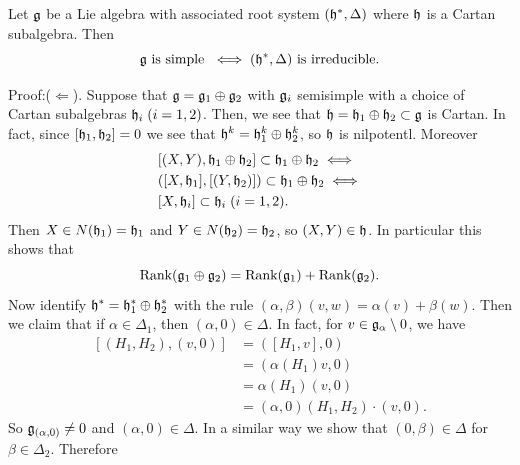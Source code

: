 \begin{dang}
    \begin{theorem}
        Let $\mathfrak{g}$ be a Lie algebra with associated root system $(\mathfrak{h}^*,\Delta)$ where $\mathfrak{h}$ is a 
        Cartan subalgebra. Then 
        \begin{equation}
            \mathfrak{g} \text{ is simple }\iff (\mathfrak{h}^*,\Delta)\text{ is irreducible}.
        \end{equation}
    \end{theorem}
\end{dang}
Proof:($\Leftarrow$). Suppose that $\mathfrak{g}=\mathfrak{g}_1\oplus\mathfrak{g}_2$ with $\mathfrak{g}_i$ semisimple with a choice of Cartan subalgebras
$\mathfrak{h}_i\;(i=1,2)$. Then, we see that $\mathfrak{h}=\mathfrak{h}_1\oplus\mathfrak{h}_2\subset \mathfrak{g}$ is Cartan. In fact, since 
$[\mathfrak{h}_1,\mathfrak{h}_2]=0$ we see that $\mathfrak{h}^k=\mathfrak{h}_1^k\oplus\mathfrak{h}_2^k$, so $\mathfrak{h}$ is nilpotentl. Moreover 
\begin{equation}
    \begin{split}
        &[(X,Y),\mathfrak{h}_1\oplus\mathfrak{h}_2]\subset \mathfrak{h}_1\oplus\mathfrak{h}_2\iff\\
        &([X,\mathfrak{h}_1],[(Y,\mathfrak{h}_2)])\subset \mathfrak{h}_1\oplus\mathfrak{h}_2\iff\\
        &[X,\mathfrak{h}_i]\subset \mathfrak{h}_i\;(i=1,2).
    \end{split}
\end{equation}
Then $X\in N(\mathfrak{h}_1)=\mathfrak{h}_1$ and $Y\in N(\mathfrak{h}_2)=\mathfrak{h}_2$, so $(X,Y)\in\mathfrak{h}$. In particular this shows that 
\begin{equation}
    \text{Rank}(\mathfrak{g}_1\oplus\mathfrak{g}_2)=\text{Rank}(\mathfrak{g}_1)+\text{Rank}(\mathfrak{g}_2).
\end{equation}
Now identify $\mathfrak{h}^*=\mathfrak{h}_1^*\oplus\mathfrak{h}_2^*$ with the rule 
$(\alpha,\beta)(v,w)=\alpha(v)+\beta(w)$. Then we claim that if $\alpha\in\Delta_1$, then $(\alpha,0)\in\Delta$. In fact, 
for $v\in\mathfrak{g}_\alpha\setminus0$, we have  
\begin{equation}
    \begin{split}
        [(H_1,H_2),(v,0)]&=([H_1,v],0)\\
        &=(\alpha(H_1)v,0)\\
        &=\alpha(H_1)(v,0)\\
        &=(\alpha,0)(H_1,H_2)\cdot(v,0).
    \end{split}
\end{equation}
So $\mathfrak{g}_{(\alpha,0)}\neq0$ and $(\alpha,0)\in\Delta$. In a similar way we show that $(0,\beta)\in\Delta$ for 
$\beta\in\Delta_2$. Therefore 
